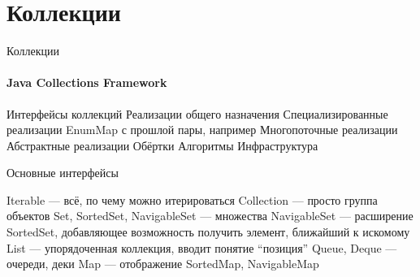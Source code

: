 \documentclass{../../slides-style}
\begin{document}
    \begin{frame}[plain]
        \titlepage
    \end{frame}

    \section{Коллекции}

    \begin{frame}{Коллекции}
        \framesubtitle{Java Collections Framework}
        \begin{outline}
            \1 Интерфейсы коллекций
            \1 Реализации общего назначения
            \1 Специализированные реализации
                \2 EnumMap с прошлой пары, например
            \1 Многопоточные реализации
            \1 Абстрактные реализации
            \1 Обёртки
            \1 Алгоритмы
            \1 Инфраструктура
        \end{outline}
    \end{frame}

    \begin{frame}{Основные интерфейсы}
        \begin{outline}
            \1 Iterable --- всё, по чему можно итерироваться
            \1 Collection --- просто группа объектов
                \2 Set, SortedSet, NavigableSet --- множества
                    \3 NavigableSet --- расширение SortedSet, добавляющее возможность получить элемент, ближайший к искомому
                \2 List --- упорядоченная коллекция, вводит понятие \enquote{позиция}
                \2 Queue, Deque --- очереди, деки
            \1 Map --- отображение
                \2 SortedMap, NavigableMap
        \end{outline}
    \end{frame}
\end{document}
